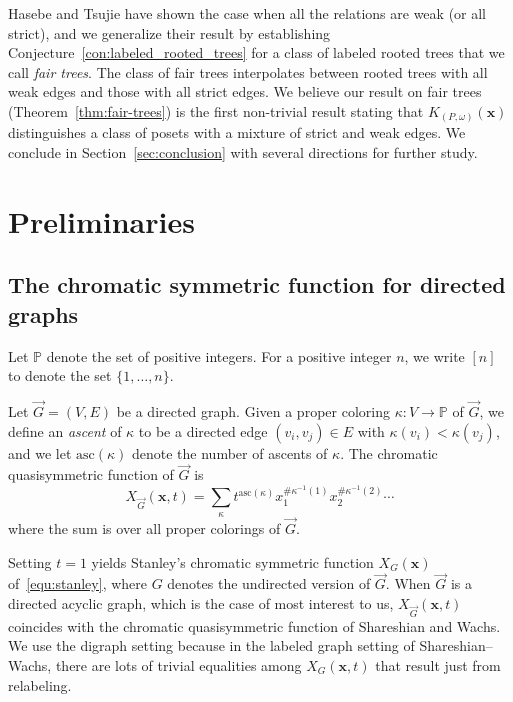 \documentclass[ALCO,Unicode,published]{cedram}
\newcommand{\diG}{\overrightarrow{G}}
\newcommand{\asc}{\mathrm{asc}}
\newcommand{\x}{\mathbf{x}}
\newcommand{\om}{\omega}
\newcommand{\kpw}{K_{(P,\om)}}
\begin{document}
 Hasebe and Tsujie \cite{HaTs17} have shown the case when all the relations are weak (or all strict), and we generalize their result by establishing Conjecture~\ref{con:labeled_rooted_trees} for a class of labeled rooted trees that we call \emph{fair trees}.  The class of fair trees interpolates between rooted trees with all weak edges and those with all strict edges.  We believe our result on fair trees (Theorem~\ref{thm:fair-trees}) is the first non-trivial result stating that $\kpw(\x)$ distinguishes a class of posets with a mixture of strict and weak edges.  We conclude in Section~\ref{sec:conclusion} with several directions for further study.  


\section{Preliminaries}\label{sec:prelims}

\subsection{The chromatic symmetric function for directed graphs}

Let $\mathbb{P}$ denote the set of positive integers.  For a positive integer $n$, we write $[n]$ to denote the set $\{1,\ldots,n\}$.

\begin{definition}\label{def:xg}
Let $\diG = (V,E)$ be a directed graph.  Given a proper coloring $\kappa: V \to \mathbb{P}$ of $\diG$, we define an \emph{ascent} of $\kappa$ to be a directed edge $(v_i, v_j) \in E$ with $\kappa(v_i) < \kappa(v_j)$, and we let $\asc(\kappa)$ denote the number of ascents of $\kappa$.  The chromatic quasisymmetric function of $\diG$ is 
\begin{equation}\label{equ:xgt}
X_{\diG}(\x, t) = \sum_{\kappa} t^{\asc(\kappa)} x_1^{\# \kappa^{-1}(1)} x_2^{\# \kappa^{-1}(2)} \cdots
\end{equation}
where the sum is over all proper colorings of $\diG$.
\end{definition}

Setting $t=1$ yields Stanley's chromatic symmetric function $X_G(\x)$ of~\eqref{equ:stanley}, where $G$ denotes the undirected version of $\diG$.  When $\diG$ is a directed acyclic graph, which is the case of most interest to us, $X_{\diG}(\x, t)$ coincides with the chromatic quasisymmetric function of Shareshian and Wachs.  We use the digraph setting because in the labeled graph setting of Shareshian--Wachs, there are lots of trivial equalities among $X_G(\x, t)$ that result just from relabeling.
\end{document}
